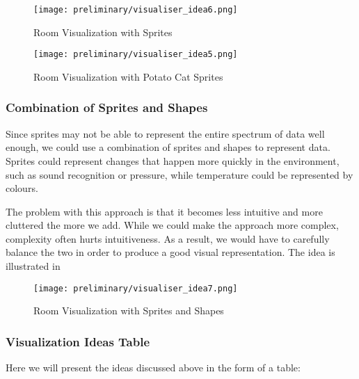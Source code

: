 \documentclass[../document]{subfiles}
\begin{document}
\begin{figure}[H]
	\texttt{[image: preliminary/visualiser\_idea6.png]}
	\caption{Room Visualization with Sprites}
	\label{fig:visualiser_idea6}
\end{figure}

\begin{figure}[H]
	\texttt{[image: preliminary/visualiser\_idea5.png]}
	\caption{Room Visualization with Potato Cat Sprites}
	\label{fig:visualiser_idea5}
\end{figure}

\subsubsection{Combination of Sprites and Shapes}

Since sprites may not be able to represent the entire spectrum of data well enough, we could use a combination of sprites and shapes to represent data. Sprites could represent changes that happen more quickly in the environment, such as sound recognition or pressure, while temperature could be represented by colours.

The problem with this approach is that it becomes less intuitive and more cluttered the more we add. While we could make the approach more complex, complexity often hurts intuitiveness. As a result, we would have to carefully balance the two in order to produce a good visual representation. The idea is illustrated in 

\begin{figure}[H]
\texttt{[image: preliminary/visualiser\_idea7.png]}
\caption{Room Visualization with Sprites and Shapes}
\label{fig:visualiser_idea7}
\end{figure}

\newpage
\subsubsection{Visualization Ideas Table}
Here we will present the ideas discussed above in the form of a table:
\end{document}
